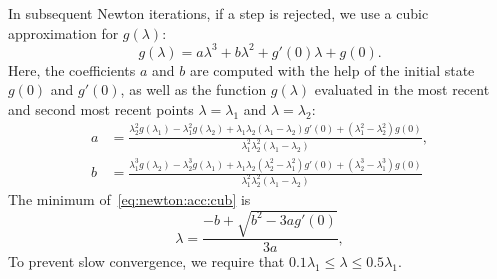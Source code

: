 \documentclass{notes}
\begin{document}
    In subsequent Newton iterations, if a step is rejected, we use a cubic
    approximation for $g(\lambda)$:
    \begin{equation}\label{eq:newton:acc:cub}
        g(\lambda) = a\lambda^3 + b\lambda^2 + g'(0)\lambda + g(0).
    \end{equation}
    Here, the coefficients $a$ and $b$ are computed with the help of the initial
    state $g(0)$ and $g'(0)$, as well as the function $g(\lambda)$ evaluated in
    the most recent and second most recent points $\lambda=\lambda_1$ and
    $\lambda=\lambda_2$:
    \begin{equation}
        \begin{aligned}
            a &= \frac{
                    \lambda_2^2g\left(\lambda_1\right) - \lambda_1^2g\left(\lambda_2\right)+
                    \lambda_1\lambda_2\left(\lambda_1-\lambda_2\right)g'(0) +
                    \left(\lambda_1^2 - \lambda_2^2\right)g(0)
                }{\lambda_1^2\lambda_2^2\left(\lambda_1-\lambda_2\right)},\\
            b &= \frac{
                    \lambda_1^3g\left(\lambda_2\right) - \lambda_2^3g\left(\lambda_1\right) +
                    \lambda_1\lambda_2\left(\lambda_2^2-\lambda_1^2\right)g'(0) +
                    \left(\lambda_2^3 - \lambda_1^3\right)g(0)
                }{\lambda_1^2\lambda_2^2\left(\lambda_1-\lambda_2\right)}
        \end{aligned}
    \end{equation}
    The minimum of~\eqref{eq:newton:acc:cub} is
    \begin{equation}
        \lambda = \frac{-b+\sqrt{b^2-3ag'(0)}}{3a},
    \end{equation}
    To prevent slow convergence, we require that
    $0.1\lambda_1\leq\lambda\leq 0.5\lambda_1$.

    \printbibliography
\end{document}
